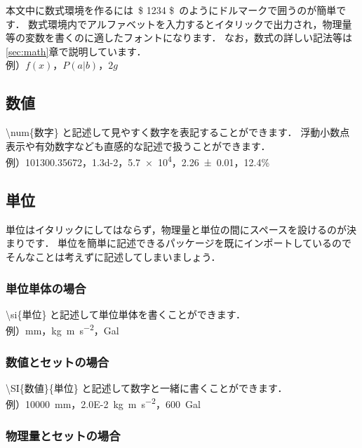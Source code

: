\documentclass[11pt,a4j,onecolumn]{jsreport} %
\begin{document}
本文中に数式環境を作るには~\$ 1234 \$~のようにドルマークで囲うのが簡単です．
数式環境内でアルファベットを入力するとイタリックで出力され，物理量等の変数を書くのに適したフォントになります．
なお，数式の詳しい記法等は\ref{sec:math}章で説明しています．\\
\hspace{3em} 例）$f(x)$，$P(a|b)$，$2g$

\subsection{数値}

\textbackslash num\{数字\} と記述して見やすく数字を表記することができます．
浮動小数点表示や有効数字なども直感的な記述で扱うことができます．\\
\hspace{3em} 例）\num{101300.35672}，\num{1.3d-2}，\num{5.7e4}，\num{2.26 +- 0.01}，\num{12.4}\%

\subsection{単位}

単位はイタリックにしてはならず，物理量と単位の間にスペースを設けるのが決まりです．
単位を簡単に記述できるパッケージを既にインポートしているのでそんなことは考えずに記述してしまいましょう．

\subsubsection{単位単体の場合}

\textbackslash si\{単位\} と記述して単位単体を書くことができます．\\
\hspace{3em} 例）\si{mm}，\si{kg~m~s^{-2}}，\si{Gal}

\subsubsection{数値とセットの場合}

\textbackslash SI\{数値\}\{単位\} と記述して数字と一緒に書くことができます．\\
\hspace{3em} 例）\SI{10000}{mm}，\SI{2.0E-2}{kg~m~s^{-2}}，\SI{600}{Gal}

\subsubsection{物理量とセットの場合}
\end{document}
